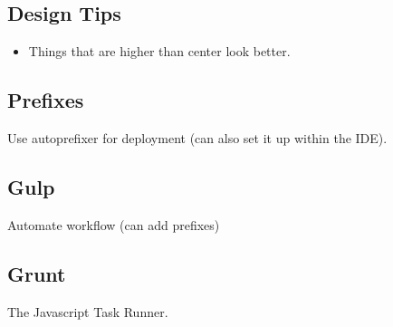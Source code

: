 \documentclass[]{article}
\newcommand{\<}{\guilsinglleft}
\renewcommand{\>}{\guilsinglright}
\begin{document}
\subsection{Design Tips}
\begin{itemize}
	\item Things that are higher than center look better.
\end{itemize}

\subsection{Prefixes}
Use autoprefixer for deployment (can also set it up within the IDE).

\subsection{Gulp}
Automate workflow (can add prefixes)

\subsection{Grunt}
The Javascript Task Runner.
\end{document}

